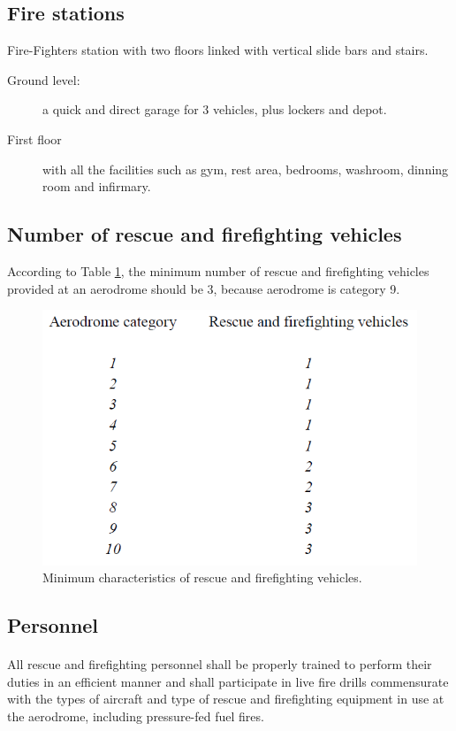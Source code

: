 		\subsection{Fire stations}
		Fire-Fighters station with two floors linked with vertical slide bars and stairs. 
		
		\begin{description}
			\item[Ground level:] a quick and direct garage for 3 vehicles, plus lockers and depot.
			\item[First floor] with all the facilities such as gym, rest area, bedrooms, washroom, dinning room and infirmary.
		\end{description}
			
	\subsection{Number of rescue and firefighting vehicles}
	According to Table \ref{table9241}, the minimum number of rescue and firefighting vehicles provided at an aerodrome should be 3, because aerodrome is category 9.
	\begin{figure}[H]
		\centering
		\includegraphics[clip, trim=0cm 0cm 0cm 0cm, width=.6\textwidth]{./images/firefighting/table9241}
		\caption{Minimum characteristics of rescue and firefighting vehicles.}
		\label{table9241}
	\end{figure}
	\subsection{Personnel}
	\paragraph{} All rescue and firefighting personnel shall be properly trained to perform their duties in an efficient manner and shall participate in live fire drills commensurate with the types of aircraft and type of rescue and firefighting equipment in use at the aerodrome, including pressure-fed fuel fires.
	

